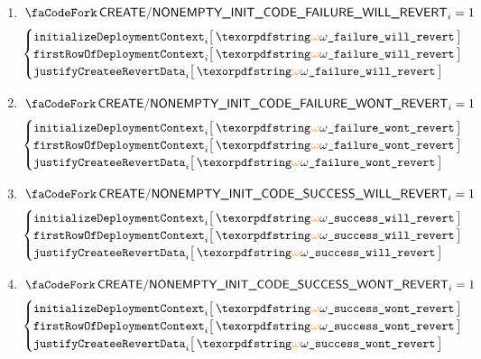 \begin{enumerate}
	\item \If $\scenCreateNonEmptyInitCodeFailureWillRevert_{i} = 1$ \Then 
		\[
			\begin{cases}
				\initializeDeploymentContext          {i}{\relofCreateNonEmptyFailureWillRevert} \\
				\firstRowOfDeployment                 {i}{\relofCreateNonEmptyFailureWillRevert} \\
				\justifyCreateeRevertData             {i}{\relofCreateNonEmptyFailureWillRevert} \\
			\end{cases}
		\]
	\item \If $\scenCreateNonEmptyInitCodeFailureWontRevert_{i} = 1$ \Then
		\[
			\begin{cases}
				\initializeDeploymentContext          {i}{\relofCreateNonEmptyFailureWontRevert} \\
				\firstRowOfDeployment                 {i}{\relofCreateNonEmptyFailureWontRevert} \\
				\justifyCreateeRevertData             {i}{\relofCreateNonEmptyFailureWontRevert} \\
			\end{cases}
		\]
	\item \If $\scenCreateNonEmptyInitCodeSuccessWillRevert_{i} = 1$ \Then
		\[
			\begin{cases}
				\initializeDeploymentContext          {i}{\relofCreateNonEmptySuccessWillRevert} \\
				\firstRowOfDeployment                 {i}{\relofCreateNonEmptySuccessWillRevert} \\
				\justifyCreateeRevertData             {i}{\relofCreateNonEmptySuccessWillRevert} \\
			\end{cases}
		\]
	\item \If $\scenCreateNonEmptyInitCodeSuccessWontRevert_{i} = 1$ \Then 
		\[ 
		\begin{cases}
			\initializeDeploymentContext                  {i}{\relofCreateNonEmptySuccessWontRevert} \\
			\firstRowOfDeployment                         {i}{\relofCreateNonEmptySuccessWontRevert} \\
			\justifyCreateeRevertData                     {i}{\relofCreateNonEmptySuccessWontRevert} \\
		\end{cases}
		\]
\end{enumerate}

